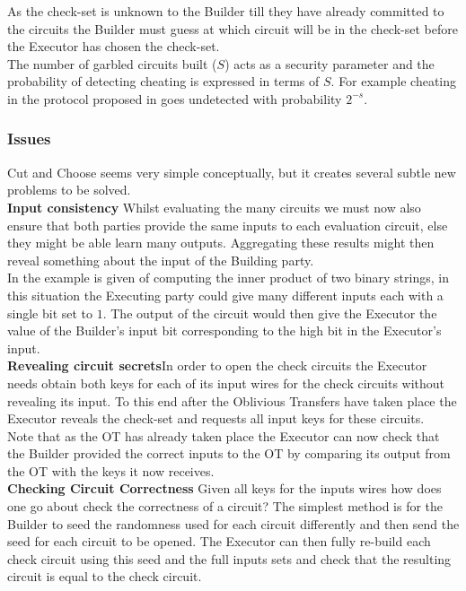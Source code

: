 \documentclass[ %
                    author={Nicholas Tutte},
                supervisor={Prof. Nigel Smart},
                    degree={MEng},
                     title={Secure Two Party Computation},
                  subtitle={A practical comparison of recent protocols},
                      type={Research - GG1K},
                      year={2015} ]{dissertation}
\begin{document}
				As the check-set is unknown to the Builder till they have already committed to the circuits the Builder must guess at which circuit will be in the check-set before the Executor has chosen the check-set.\\

				The number of garbled circuits built ($S$) acts as a security parameter and the probability of detecting cheating is expressed in terms of $S$. For example cheating in the protocol proposed in \cite{Lindell_CnC_2013} goes undetected with probability $2^{-s}$.

			\subsubsection{Issues}
				Cut and Choose seems very simple conceptually, but it creates several subtle new problems to be solved.\\

				\noindent \textbf{Input consistency} Whilst evaluating the many circuits we must now also ensure that both parties provide the same inputs to each evaluation  circuit, else they might be able learn many outputs. Aggregating these results might then reveal something about the input of the Building party.\\

				In \cite{LindellAndPinkas2007} the example is given of computing the inner product of two binary strings, in this situation the Executing party could give many different inputs each with a single bit set to $1$. The output of the circuit would then give the Executor the value of the Builder's input bit corresponding to the high bit in the Executor's input.\\

				\noindent \textbf{Revealing circuit secrets}In order to open the check circuits the Executor needs obtain both keys for each of its input wires for the check circuits without revealing its input. To this end after the Oblivious Transfers have taken place the Executor reveals the check-set and requests all input keys for these circuits.\\

				Note that as the OT has already taken place the Executor can now check that the Builder provided the correct inputs to the OT by comparing its output from the OT with the keys it now receives.\\

				\noindent \textbf{Checking Circuit Correctness} Given all keys for the inputs wires how does one go about check the correctness of a circuit? The simplest method is for the Builder to seed the randomness used for each circuit differently and then send the seed for each circuit to be opened. The Executor can then fully re-build each check circuit using this seed and the full inputs sets and check that the resulting circuit is equal to the check circuit.\\
\end{document}
